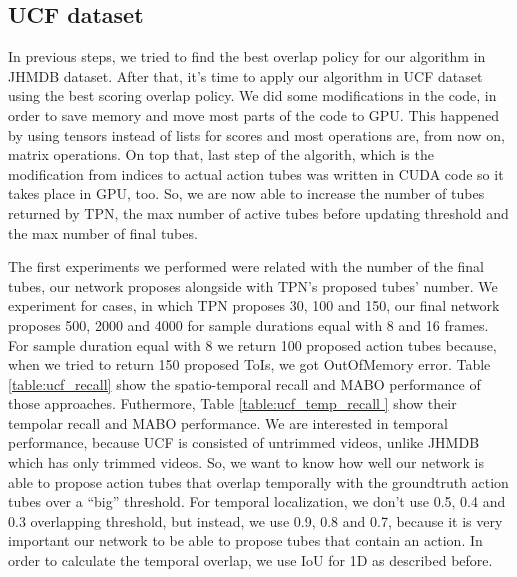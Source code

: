 \documentclass{report}
\begin{document}
\subsection{UCF dataset}
In previous steps, we tried to find the best overlap policy for our algorithm in JHMDB dataset. After that, it's time to apply our algorithm in UCF dataset using the best scoring
overlap policy. We did some modifications in the code, in order to save memory and move most parts of the code to GPU. This happened by using tensors instead of lists for scores and
most operations are, from now on, matrix operations. On top that, last step of the algorith, which is the modification from indices to actual action tubes was written in CUDA code so
it takes place in GPU, too. So, we are now able to increase the number of tubes returned by TPN, the max number of active tubes before updating threshold and the max number of final
tubes. \par
The first experiments we performed were related with the number of the final tubes, our network proposes alongside with TPN's proposed
tubes' number. We experiment for cases, in which TPN proposes 30, 100 and 150, our final network proposes 500, 2000 and 4000 for
sample durations equal with 8 and 16 frames. For sample duration equal with 8 we return 100 proposed action tubes because, when we
tried to return 150 proposed ToIs, we got OutOfMemory error.
Table \ref{table:ucf_recall} show the spatio-temporal recall and MABO performance of those approaches. Futhermore, Table \ref{table:ucf_temp_recall } show their tempolar recall and MABO performance. We are interested in temporal performance, because UCF is consisted of
untrimmed videos, unlike JHMDB which has only trimmed videos. So, we want to know how well our network is able to propose action tubes that
overlap temporally with the groundtruth action tubes over a ``big'' threshold. For temporal localization, we don't use 0.5, 0.4 and 0.3
overlapping threshold, but instead, we use 0.9, 0.8 and 0.7, because it is very important our network to be able to propose tubes that
contain an action. In order to calculate the temporal overlap, we use IoU for 1D as described before.
\end{document}
